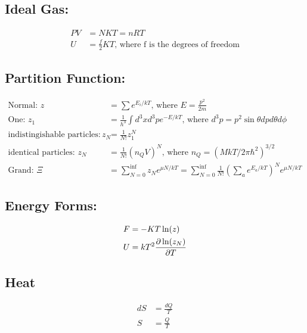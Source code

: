 \subsection*{Ideal Gas:}
\begin{align}
	PV & = NKT = nRT                                                 \\
	U  & = \frac{f}{2} KT \text{, where f is the degrees of freedom}
\end{align}

\subsection*{Partition Function:}

\begin{align}
	\text{Normal:  } z                      & = \sum e^{E_i / kT} \text{, where } E = \frac{p^2}{2m}                                                         \\
	\text{One: } z_1                        & = \frac{1}{h^3} \int d^3x d^3p e^{-E/ kT}\text{, where } d^3p = p^2\sin\theta dp d\theta d\phi                 \\
	\text{indistingishable particles: } z_N & = \frac{1}{N!} z_1^N                                                                                           \\
	\text{identical particles: } z_N        & = \frac{1}{N!} (n_Q V)^N \text{, where }n_Q=(MkT/2\pi \hbar^2)^{3/2}                                           \\
	\text{Grand: } \Xi                      & = \sum_{N=0}^{\inf} z_N e^{\mu N / kT} = \sum_{N=0}^{\inf} \frac{1}{N!} (\sum_a e^{E_a / kT})^N e^{\mu N / kT}
\end{align}


\subsection*{Energy Forms:}
\begin{align}
	F & = - KT \ln(z)             \\
	U & = k T^2 \pdv{\ln(z_N)}{T}
\end{align}

\subsection*{Heat}
\begin{align}
	dS & = \frac{dQ}{T} \\
	S  & = \frac{Q}{T}
\end{align}

